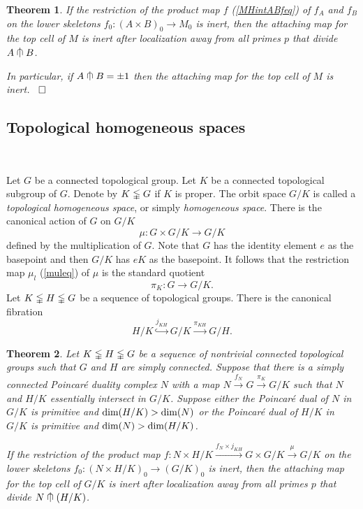 \documentclass[a4]{amsart}
\newtheorem{theorem}{Theorem}[section]
\theoremstyle{definition}
\newcommand{\testcap}{\mathrel{\vcenter{\offinterlineskip
\hbox{$\cap$}\vskip-1.8ex\hbox{$\kern0.2em | \kern0.15em$}}}}
\newcommand{\qqed}{\hfill\Box}
\begin{document}
\begin{sloppypar}
\begin{theorem}
If the restriction of the product map $f$ (\ref{MHintABfeq}) of $f_A$ and $f_B$ on the lower skeletons 
$
f_0: (A\times B)_0\stackrel{}{\longrightarrow} M_0
$ 
is inert, 
then the attaching map for the top cell of $M$ is inert after localization away from all primes $p$ that divide $A\testcap B$.

In particular, if $A\testcap B=\pm 1$ then the attaching map for the top cell of $M$ is inert.  ~$\qqed$
\end{theorem}


\subsection{Topological homogeneous spaces}
\label{subsec: top-hom}

$\, $

Let $G$ be a connected topological group. Let $K$ be a connected topological subgroup of $G$. Denote by $K\lvertneqq G$ if $K$ is proper. The orbit space $G/K$ is called a {\it topological homogeneous space}, or simply {\it homogeneous space}. There is the canonical action of $G$ on $G/K$
\[
\mu: G\times G/K\stackrel{}{\longrightarrow} G/K
\]
defined by the multiplication of $G$. 
Note that $G$ has the identity element $e$ as the basepoint and then $G/K$ has $eK$ as the basepoint. It follows that the restriction map $\mu_l$ (\ref{muleq}) of $\mu$ is the standard quotient 
\[
\pi_K: G\stackrel{}{\longrightarrow} G/K.
\]
Let $K\lvertneqq H\lvertneqq G$ be a sequence of topological groups. There is the canonical fibration
\[\label{KHGeq}
H/K\stackrel{j_{KH}}{\hookrightarrow} G/K\stackrel{\pi_{KH}}{\longrightarrow} G/H.
\]

\begin{theorem}\label{tophomthm}
Let $K\lvertneqq H\lvertneqq G$ be a sequence of nontrivial connected topological groups such that $G$ and $H$ are simply connected. 
Suppose that there is a simply connected Poincar\'{e} duality complex $N$ with a map $N\stackrel{f_N}{\longrightarrow} G\stackrel{\pi_K}{\longrightarrow}G/K$ such that $N$ and $H/K$ essentially intersect in $G/K$. 
Suppose either the Poincar\'{e} dual of $N$ in $G/K$ is primitive and ${\rm dim}(H/K)>{\rm dim}(N)$ or the Poincar\'{e} dual of $H/K$ in $G/K$ is primitive and ${\rm dim}(N)>{\rm dim}(H/K)$. 


If the restriction of the product map $f: N\times H/K\stackrel{f_N\times j_{KH}}{\longrightarrow} G\times G/K\stackrel{\mu}{\longrightarrow} G/K$ on the lower skeletons 
$
f_0: (N\times H/K)_0\stackrel{}{\longrightarrow} (G/K)_0
$ 
is inert, 
then the attaching map for the top cell of $G/K$ is inert after localization away from all primes $p$ that divide $N\testcap (H/K)$.


\end{theorem}
\end{sloppypar}
\end{document}
